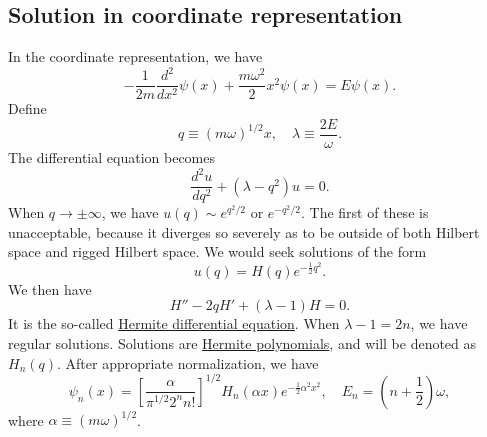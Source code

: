 \subsection{Solution in coordinate representation}
In the coordinate representation, we have
\[-\frac{1}{2m} \frac{d^2}{dx^2} \psi(x) + \frac{m\omega^2}{2}x^2 \psi(x) = E \psi(x).\]
Define
\[q \equiv (m\omega)^{1/2}x , \quad \lambda \equiv \frac{2E}{\omega}.\]
The differential equation becomes
\[\frac{d^2u}{dq^2} + (\lambda - q^2)u = 0.\]
When $q \to \pm \infty$, we have $u(q) \sim e^{q^2/2}$ or $e^{-q^2/2}$. The first of these is unacceptable, because it
diverges so severely as to be outside of both Hilbert space and rigged Hilbert space. We would seek solutions of the form 
\[u(q) = H(q) e^{-\frac{1}{2}q^2}.\]
We then have
\[H'' - 2qH' + (\lambda-1)H = 0.\]
It is the so-called \href{http://mathworld.wolfram.com/HermiteDifferentialEquation.html}{Hermite differential equation}. When $\lambda - 1 = 2n$, we have regular solutions. Solutions are \href{http://mathworld.wolfram.com/HermitePolynomial.html}{Hermite polynomials}, and will be denoted as $H_n(q)$. After appropriate normalization, we have
\[\psi_n(x) = \left [ \frac{\alpha}{\pi^{1/2} 2^n n!} \right ]^{1/2} H_n(\alpha x) e^{-\frac{1}{2}\alpha^2 x^2} , \quad E_n = (n+\frac{1}{2})\omega,\]
where $\alpha \equiv (m\omega)^{1/2}$.

